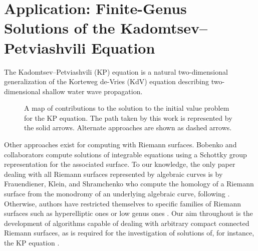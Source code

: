 \chapter{Application: Finite-Genus Solutions of the Kadomtsev--Petviashvili
  Equation}\label{ch:kp}

The Kadomtsev--Petviashvili (KP) equation is a natural two-dimensional
generalization of the Korteweg de-Vries (KdV) equation describing
two-dimensional shallow water wave propagation.

\begin{figure}
  \centering
  \caption{A map of contributions to the solution to the initial value problem
    for the KP equation. The path taken by this work is represented by the solid
    arrows. Alternate approaches are shown as dashed arrows.}
\end{figure}



Other approaches exist for computing with Riemann surfaces. Bobenko and
collaborators \cite{belokolos, BobenkoBordag89} compute solutions of integrable
equations using a Schottky group representation for the associated surface. To
our knowledge, the only paper dealing with all Riemann surfaces represented by
algebraic curves is by Frauendiener, Klein, and Shramchenko who compute the
homology of a Riemann surface from the monodromy of an underlying algebraic
curve, following \cite{dvh1}. Otherwise, authors have restricted themselves to
specific families of Riemann surfaces such as hyperelliptic ones
\cite{FrauendienerKlein06,FrauendienerKlein15} or low genus ones
\cite{DFS97,FinkelSegur85,DeconinckSwierczewski13}. Our aim throughout is the
development of algorithms capable of dealing with arbitrary compact connected
Riemann surfaces, as is required for the investigation of solutions of, for
instance, the KP equation \cite{DS98,Shiota86}.



